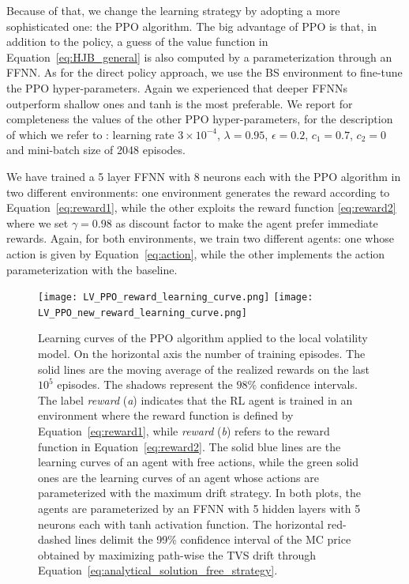 \documentclass[11pt]{article}
\begin{document}
Because of that, we change the learning strategy by adopting a more sophisticated one: the PPO algorithm. The big advantage of PPO is that, in addition to the policy, a guess of the value function in Equation~\eqref{eq:HJB_general} is also computed by a parameterization through an FFNN. As for the direct policy approach, we use the BS environment to fine-tune the PPO hyper-parameters. Again we experienced that deeper FFNNs outperform shallow ones and tanh is the most preferable. We report for completeness the values of the other PPO hyper-parameters, for the description of which we refer to \cite{Schulman2017}: learning rate $3\times 10^{-4}$, $\lambda=0.95$, $\epsilon=0.2$, $c_1=0.7$, $c_2=0$ and mini-batch size of 2048 episodes. 

We have trained a 5 layer FFNN with 8 neurons each with the PPO algorithm in two different environments: one environment generates the reward according to Equation~\eqref{eq:reward1}, while the other exploits the reward function \eqref{eq:reward2} where we set $\gamma=0.98$ as discount factor to make the agent prefer immediate rewards. Again, for both environments, we train two different agents: one whose action is given by Equation~\eqref{eq:action}, while the other implements the action parameterization with the baseline.
\begin{figure}[h!]
	\centering
	\texttt{[image: LV\_PPO\_reward\_learning\_curve.png]}
	\texttt{[image: LV\_PPO\_new\_reward\_learning\_curve.png]}
	\caption{Learning curves of the PPO algorithm applied to the local volatility model. On the horizontal axis the number of training episodes. The solid lines are the moving average of the realized rewards on the last $10^5$ episodes. The shadows represent the $98\%$ confidence intervals. The label {\it reward} ({\it a}) indicates that the RL agent is trained in an environment where the reward function is defined by Equation~\eqref{eq:reward1}, while {\it reward} ({\it b}) refers to the reward function in Equation~\eqref{eq:reward2}. The solid blue lines are the learning curves of an agent with free actions, while the green solid ones are the learning curves of an agent whose actions are parameterized with the maximum drift strategy. In both plots, the agents are parameterized by an FFNN with 5 hidden layers with 5 neurons each with tanh activation function. The horizontal red-dashed lines delimit the 99\% confidence interval of the MC price obtained by maximizing path-wise the TVS drift through Equation~\eqref{eq:analytical_solution_free_strategy}.}\label{fig:PPO_results}
\end{figure}
\end{document}
